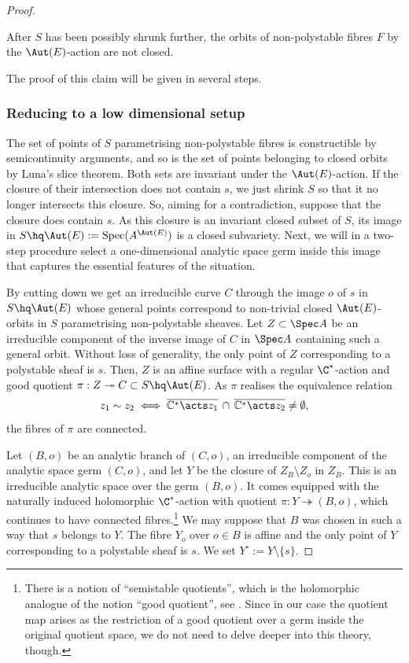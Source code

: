 \begin{proof}
\begin{key*}
After $S$ has been possibly shrunk further, the orbits of non-polystable fibres $F$ by the $\Aut(E)$-action are not closed.
\end{key*}

The proof of this claim will be given in several steps.

\subsubsection*{Reducing to a low dimensional setup} The set of points of $S$ parametrising non-polystable fibres is constructible by semicontinuity arguments, and so is the set of points belonging to closed orbits by Luna's slice theorem. Both sets are invariant under the $\Aut(E)$-action. If the closure of their intersection does not contain $s$, we just shrink $S$ so that it no longer intersects this closure. So, aiming for a contradiction, suppose that the closure does contain $s$. As this closure is an invariant closed subset of $S$, its image in $S\hq \Aut(E) := \mathrm{Spec}(A^{\Aut(E)})$ is a closed subvariety. Next, we will in a two-step procedure select a one-dimensional analytic space germ inside this image that captures the essential features of the situation.

By cutting down we get an irreducible curve $C$ through the image $o$ of $s$ in $S \hq \Aut(E)$ whose general points correspond to non-trivial closed $\Aut(E)$-orbits in $S$ parametrising non-polystable sheaves.
Let $Z\subset \Spec A$ be an irreducible component of the inverse image of $C$ in $\Spec A$ containing such a general orbit. Without loss of generality, the only point of $Z$ corresponding to a polystable sheaf is $s$. Then, $Z$ is an affine surface with a regular $\C^*$-action and good quotient $\pi :Z \twoheadrightarrow C \subset S \hq \Aut(E)$. As $\pi$ realises the equivalence relation
\[ z_1 \sim z_2 \iff \overline{\mathbb{C}^*\acts z_1} \,\cap\, \overline{\mathbb{C}^* \acts z_2} \neq \emptyset,\]
the fibres of $\pi$ are connected.

Let $(B,o)$ be an analytic branch of $(C,o)$, \ie an irreducible component of the analytic space germ $(C,o)$, and let $Y$ be the closure of $Z_B\setminus Z_o$ in $Z_B$. This is an irreducible analytic space over the germ $(B,o)$. It comes equipped with the naturally induced holomorphic $\C^*$-action with quotient $\pi :Y \twoheadrightarrow (B,o)$, which continues to have connected fibres.\footnote{There is a notion of ``semistable quotients'', which is the holomorphic analogue of the notion ``good quotient'', \eg see \cite{HMP}. Since in our case the quotient map arises as the restriction of a good quotient over a germ inside the original quotient space, we do not need to delve deeper into this theory, though.} We may suppose that $B$ was chosen in such a way that $s$ belongs to $Y$. The fibre $Y_o$ over $o\in B$ is affine and the only point of $Y$ corresponding to a polystable sheaf is $s$. We set $Y^\circ:=Y\setminus\{ s\}$.


\end{proof}
